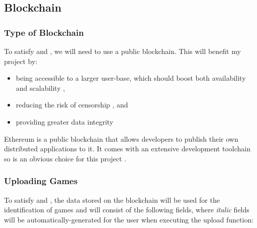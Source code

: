 
\subsection{Blockchain}\label{subsec:design-con-eth}

\subsubsection*{Type of Blockchain}

To satisfy  and , we will need to use a public blockchain. This will benefit my project by:
\vspace{2mm}
\begin{itemize}
  \item being accessible to a larger user-base, which should boost both availability and scalability ,
  \item reducing the risk of censorship , and
  \item providing greater data integrity 
\end{itemize}

\vspace{2mm}\noindent Ethereum is a public blockchain that allows developers to publish their own distributed applications to it. It comes with an extensive development toolchain so is an obvious choice for this project .

\subsubsection*{Uploading Games}
\label{subsubsec:eth-data}

To satisfy  and , the data stored on the blockchain will be used for the identification of games and will consist of the following fields, where \textit{italic} fields will be automatically-generated for the user when executing the upload function:

